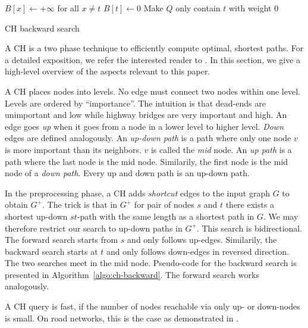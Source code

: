 \documentclass[sigconf]{acmart}
\begin{document}
\begin{algorithm2e}
$B[x] \leftarrow +\infty$ for all $x\neq t$\;
$B[t] \leftarrow 0$\;
Make $Q$ only contain $t$ with weight $0$\;
\caption{CH backward search}
\label{algo:ch-backward}
\end{algorithm2e}

A CH is a two phase technique to efficiently compute optimal, shortest paths.
For a detailed exposition, we refer the interested reader to \cite{dsw-cch-15,gssv-erlrn-12}.
In this section, we give a high-level overview of the aspects relevant to this paper.

A CH places nodes into levels.
No edge must connect two nodes within one level.
Levels are ordered by ``importance''.
The intuition is that dead-ends are unimportant and low while highway bridges are very important and high.
An edge goes \emph{up} when it goes from a node in a lower level to higher level.
\emph{Down} edges are defined analogously.
An \emph{up-down path} is a path where only one node $v$ is more important than its neighbors.
$v$ is called the \emph{mid} node.
An \emph{up path} is a path where the last node is the mid node.
Similarily, the first node is the mid node of a \emph{down path}.
Every up and down path is an up-down path.

In the preprocessing phase, a CH adds \emph{shortcut} edges to the input graph $G$ to obtain $G^+$.
The trick is that in $G^+$ for pair of nodes $s$ and $t$ there exists a shortest up-down $st$-path with the same length as a shortest path in $G$.
We may therefore restrict our search to up-down paths in $G^+$.
This search is bidirectional.
The forward search starts from $s$ and only follows up-edges.
Similarily, the backward search starts at $t$ and only follows down-edges in reversed direction.
The two searches meet in the mid node.
Pseudo-code for the backward search is presented in Algorithm~\ref{algo:ch-backward}.
The forward search works analogously.

A CH query is fast, if the number of nodes reachable via only up- or down-nodes is small.
On road networks, this is the case as demonstrated in \cite{gssv-erlrn-12,dgrw-gpnc-11,dgpw-crprn-13,dsw-cch-15,hs-gbpo-18}.
\end{document}
